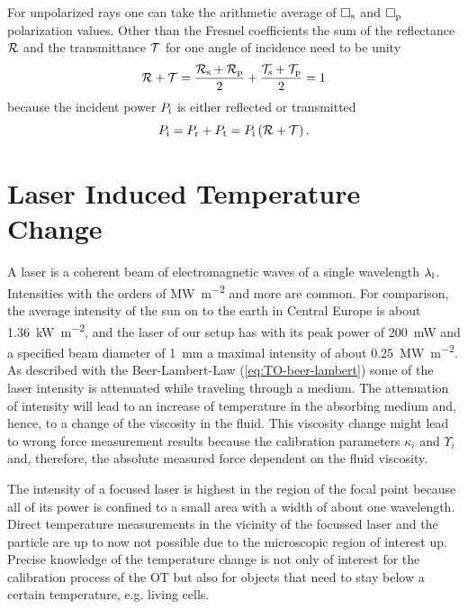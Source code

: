 For unpolarized rays one can take the arithmetic average of $\Box_{\mathrm{s}}$ and 
$\Box_{\mathrm{p}}$ polarization values. Other than the Fresnel coefficients the 
sum of the reflectance $\mathcal{R}$ and the transmittance $\mathcal{T}$ for one 
angle of incidence need to be unity
\begin{equation}
  \mathcal{R} + \mathcal{T} = 
  \frac{\mathcal{R}_{\mathrm{s}}+\mathcal{R}_{\mathrm{p}}}{2} +
  \frac{\mathcal{T}_{\mathrm{s}}+\mathcal{T}_{\mathrm{p}}}{2} = 1 
  \label{eq:TO-fresnel}
\end{equation}
because the incident power $P_{\mathrm{i}}$ is either reflected or transmitted
\begin{equation}
  P_{\mathrm{i}} = P_{\mathrm{r}} + P_{\mathrm{t}} = P_{\mathrm{i}}\left( \mathcal{R} + \mathcal{T} 
  \right).
\end{equation}

\section{Laser Induced Temperature Change\label{sec:TO-temperature}}

A laser is a coherent beam of electromagnetic waves of a single wavelength 
$\lambda_{\mathrm{l}}$. Intensities with the orders of \si{\mega\watt\per\square\meter} and 
more are common. For comparison, the average intensity of the sun on to the 
earth in Central Europe is about \SI{1.36}{\kilo\watt\per\square\meter}, and 
the laser of our setup has with its peak power of \SI{200}{\milli\watt} and a 
specified beam diameter of \SI{1}{\mm} a maximal intensity of about 
\SI{0.25}{\mega\watt\per\square\meter}. As described with the Beer-Lambert-Law
(\cref{eq:TO-beer-lambert}) some of the laser intensity is attenuated while 
traveling through a medium. The attenuation of intensity will lead to an 
increase of temperature in the absorbing medium and, hence, to a change of the 
viscosity in the fluid. This viscosity change might lead to wrong force 
measurement results because the calibration parameters $\kappa_{i}$ and 
$\Upsilon_{i}$ and, therefore, the absolute measured force dependent on the 
fluid viscosity.

The intensity of a focused laser is highest in the region of the focal point 
because all of its power is confined to a small area with a width of about one 
wavelength. Direct temperature measurements in the vicinity of the focussed 
laser and the particle are up to now not possible due to the microscopic region 
of interest up. Precise knowledge of the temperature change is not only of 
interest for the calibration process of the OT but also for objects that need 
to stay below a certain temperature, e.g. living cells.

